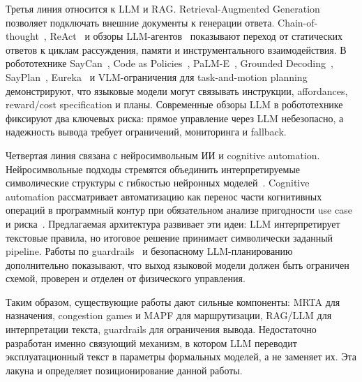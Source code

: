 \documentclass[runningheads]{llncs}
\begin{document}
Третья линия относится к LLM и RAG. Retrieval-Augmented Generation~\cite{Lewis2020RAG} позволяет подключать внешние документы к генерации ответа. Chain-of-thought~\cite{Wei2022CoT}, ReAct~\cite{Yao2023ReAct} и обзоры LLM-агентов~\cite{Xi2023LLMAgentSurvey} показывают переход от статических ответов к циклам рассуждения, памяти и инструментального взаимодействия. В робототехнике SayCan~\cite{Ahn2022SayCan}, Code as Policies~\cite{Liang2022CodeAsPolicies}, PaLM-E~\cite{Driess2023PalmE}, Grounded Decoding~\cite{Huang2023GroundedDecoding}, SayPlan~\cite{Rana2023SayPlan}, Eureka~\cite{Ma2024Eureka} и VLM-ограничения для task-and-motion planning~\cite{Kumar2024OWLTAMP} демонстрируют, что языковые модели могут связывать инструкции, affordances, reward/cost specification и планы. Современные обзоры LLM в робототехнике~\cite{Wang2024LLMRoboticsSurvey,Li2025LLMMultiRobotSurvey} фиксируют два ключевых риска: прямое управление через LLM небезопасно, а надежность вывода требует ограничений, мониторинга и fallback.

Четвертая линия связана с нейросимвольным ИИ и cognitive automation. Нейросимвольные подходы стремятся объединить интерпретируемые символические структуры с гибкостью нейронных моделей~\cite{Sarker2021NeuroSymbolic}. Cognitive automation рассматривает автоматизацию как перенос части когнитивных операций в программный контур при обязательном анализе пригодности use case и риска~\cite{Engel2024CognitiveAutomation}. Предлагаемая архитектура развивает эти идеи: LLM интерпретирует текстовые правила, но итоговое решение принимает символически заданный pipeline. Работы по guardrails~\cite{Dong2024Guardrails} и безопасному LLM-планированию~\cite{Obi2025SafePlan} дополнительно показывают, что выход языковой модели должен быть ограничен схемой, проверен и отделен от физического управления.

Таким образом, существующие работы дают сильные компоненты: MRTA для назначения, congestion games и MAPF для маршрутизации, RAG/LLM для интерпретации текста, guardrails для ограничения вывода. Недостаточно разработан именно связующий механизм, в котором LLM переводит эксплуатационный текст в параметры формальных моделей, а не заменяет их. Эта лакуна и определяет позиционирование данной работы.
\end{document}
